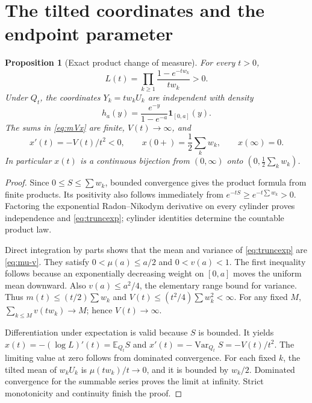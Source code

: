 \documentclass[11pt,a4paper]{article}
\numberwithin{equation}{section}
\newtheorem{proposition}[proposition]{Proposition}
\theoremstyle{definition}
\theoremstyle{remark}
\newcommand{\E}{\mathbb E}
\newcommand{\Qt}{Q_t}
\newcommand{\Var}{\operatorname{Var}}
\newcommand{\ind}{\mathbf 1}
\begin{document}
\section{The tilted coordinates and the endpoint parameter}
\label{sec:tilt}

\begin{proposition}[Exact product change of measure]\label{prop:tilt}
For every $t>0$,
\begin{equation}\label{eq:laplace}
 L(t)=\prod_{k\ge1}\frac{1-e^{-tw_k}}{tw_k}>0.
\end{equation}
Under $\Qt$, the coordinates $Y_k=tw_kU_k$ are independent with density
\begin{equation}\label{eq:truncexp}
 h_a(y)=\frac{e^{-y}}{1-e^{-a}}\ind_{[0,a]}(y).
\end{equation}
The sums in \cref{eq:mVx} are finite, $V(t)\to\infty$, and
\[
 x'(t)=-V(t)/t^2<0,\qquad
 x(0+)=\frac12\sum_kw_k,\qquad x(\infty)=0.
\]
In particular $x(t)$ is a continuous bijection from $(0,\infty)$ onto
$(0,\frac12\sum_kw_k)$.
\end{proposition}
\begin{proof}
Since $0\le S\le\sum w_k$, bounded convergence gives the product
formula from finite products. Its positivity also follows immediately
from $e^{-tS}\ge e^{-t\sum w_k}>0$. Factoring the exponential
Radon--Nikodym derivative on every cylinder proves independence and
\cref{eq:truncexp}; cylinder identities determine the countable product
law.

Direct integration by parts shows that the mean and variance of
\cref{eq:truncexp} are
\cref{eq:mu-v}. They satisfy $0<\mu(a)\le a/2$ and $0<v(a)<1$.
The first inequality follows because an exponentially decreasing
weight on $[0,a]$ moves the uniform mean downward. Also
$v(a)\le a^2/4$, the elementary range bound for variance.
Thus $m(t)\le(t/2)\sum w_k$ and
$V(t)\le(t^2/4)\sum w_k^2<\infty$.
For any fixed $M$, $\sum_{k\le M}v(tw_k)\to M$; hence $V(t)\to\infty$.

Differentiation under expectation is valid because $S$ is bounded.
It yields $x(t)=-(\log L)'(t)=\E_{\Qt}S$ and
$x'(t)=-\Var_{\Qt}S=-V(t)/t^2$. The limiting value at zero follows
from dominated convergence. For each fixed $k$, the tilted mean of
$w_kU_k$ is $\mu(tw_k)/t\to0$, and it is bounded by $w_k/2$.
Dominated convergence for the summable series proves the limit at
infinity. Strict monotonicity and continuity finish the proof.
\end{proof}
\end{document}
